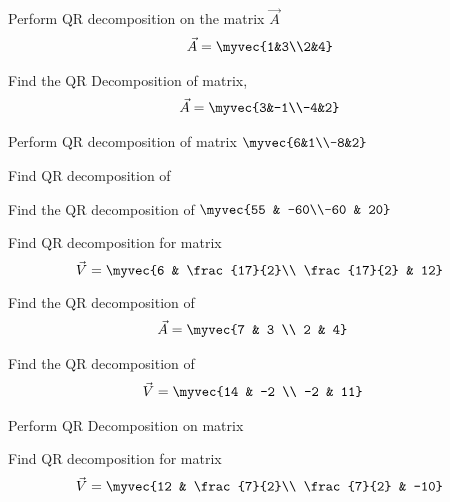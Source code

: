 %
\item Perform QR decomposition on the matrix $\vec{A}$ 
\begin{align}
\vec{A}=\myvec{1&3\\2&4} \label{eq:solutions/decomp/2/31/eq:1}
\end{align}
%
\solution

%
\item Find the QR Decomposition of matrix,
\begin{align}
\vec{A} = \myvec{3&-1\\-4&2}
\label{eq:solutions/decomp/2/32/eq:p0}
\end{align}
%
\solution

\item Perform QR decomposition of matrix $\myvec{6&1\\-8&2}$
\solution

\item Find QR decomposition of 
%
\solution

%
\item Find the QR decomposition of $\myvec{55 & -60\\-60 & 20}$

\solution

%
\item 
Find QR decomposition for matrix
\begin{equation}
	\vec{V} = \myvec{6 & \frac{17}{2}\\ \frac{17}{2} & 12}
\end{equation}
%
\solution

%
\item 
Find the QR decomposition of 
\begin{align}
    \vec{A} &= \myvec{7 & 3 \\ 2 & 4} 
\end{align}
%
\solution

\item Find the QR decomposition of
\begin{align}
\vec{V} &= \myvec{14  & -2 \\ -2 & 11}
\end{align}
\solution

\item 
Perform QR Decomposition on matrix  
%
\solution

%
\item Find QR decomposition for matrix
\begin{equation}
	\vec{V} = \myvec{12 & \frac{7}{2}\\ \frac{7}{2} & -10}
\end{equation}

